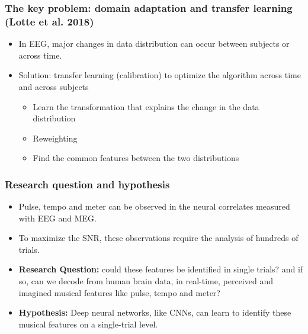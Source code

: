 \documentclass{beamer}
\begin{document}
\begin{frame}
	\frametitle{The key problem: domain adaptation and transfer learning (Lotte et al. 2018)}
	
	\begin{itemize}

		\item In EEG, major changes in data distribution can occur between subjects or across time.

		\item Solution: transfer learning (calibration) to optimize the algorithm across time and across subjects

		\begin{itemize}
			\item Learn the transformation that explains the change in the data distribution
			\item Reweighting
			\item Find the common features between the two distributions
		\end{itemize}

	\end{itemize}

\end{frame}



\begin{frame}
	\frametitle{Research question and hypothesis}
	
	\begin{itemize}

		\item Pulse, tempo and meter can be observed in the neural correlates measured with EEG and MEG.

		\item To maximize the SNR, these observations require the analysis of hundreds of trials.

		\item \textbf{Research Question:} could these features be identified in single trials? and if so, can we decode from human brain data, in real-time, perceived and imagined musical features like pulse, tempo and meter? 
			 
		\item \textbf{Hypothesis:} Deep neural networks, like CNNs, can learn to identify these musical features on a single-trial level.

	\end{itemize}

\end{frame}
\end{document}
